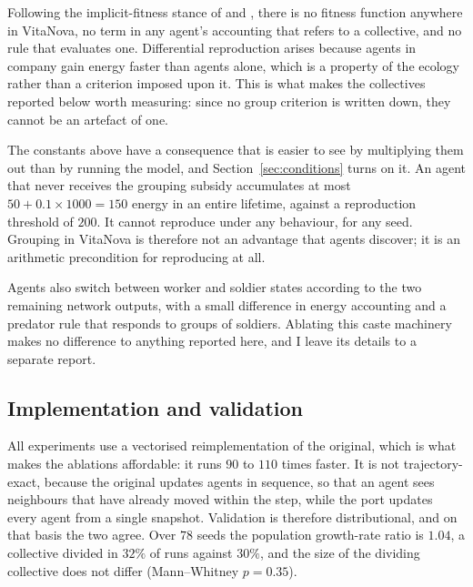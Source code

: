 \documentclass{artificial-life}
\begin{document}
Following the implicit-fitness stance of \citet{ray1991approach} and
\citet{yaeger1994polyworld}, there is no fitness function anywhere in VitaNova,
no term in any agent's accounting that refers to a collective, and no rule that
evaluates one. Differential reproduction arises because agents in company gain
energy faster than agents alone, which is a property of the ecology rather than
a criterion imposed upon it. This is what makes the collectives reported below
worth measuring: since no group criterion is written down, they cannot be an
artefact of one.

The constants above have a consequence that is easier to see by multiplying them
out than by running the model, and Section~\ref{sec:conditions} turns on it. An
agent that never receives the grouping subsidy accumulates at most
$50 + 0.1 \times 1000 = 150$ energy in an entire lifetime, against a
reproduction threshold of $200$. It cannot reproduce under any behaviour, for
any seed. Grouping in VitaNova is therefore not an advantage that agents
discover; it is an arithmetic precondition for reproducing at all.

Agents also switch between worker and soldier states according to the two
remaining network outputs, with a small difference in energy accounting and a
predator rule that responds to groups of soldiers. Ablating this caste machinery
makes no difference to anything reported here, and I leave its details to a
separate report.

\subsection{Implementation and validation}

All experiments use a vectorised reimplementation of the original, which is what
makes the ablations affordable: it runs $90$ to $110$ times faster. It is not
trajectory-exact, because the original updates agents in sequence, so that an
agent sees neighbours that have already moved within the step, while the port
updates every agent from a single snapshot. Validation is therefore
distributional, and on that basis the two agree. Over $78$ seeds the population
growth-rate ratio is $1.04$, a collective divided in $32\%$ of runs against
$30\%$, and the size of the dividing collective does not differ
(Mann--Whitney $p = 0.35$).
\end{document}
